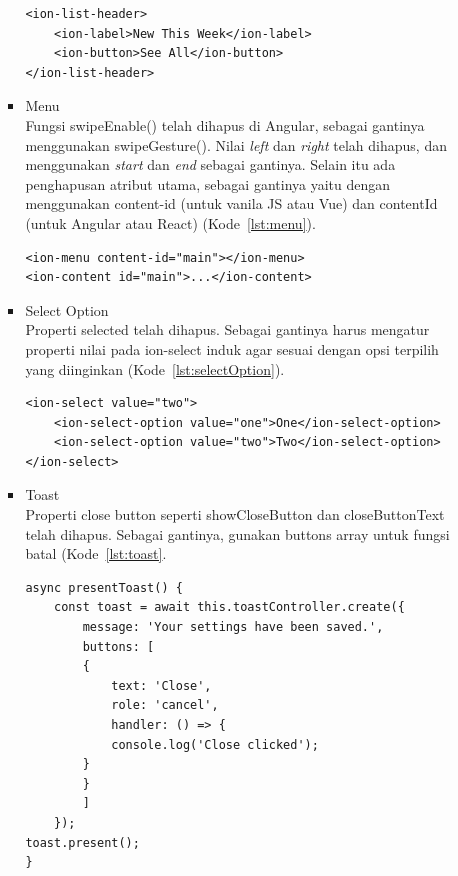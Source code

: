\begin{enumerate}
\begin{itemize}
\begin{itemize}
\begin{lstlisting}[label={lst:listHeader}, caption=Kode Program untuk List Header]
<ion-list-header>
	<ion-label>New This Week</ion-label>
	<ion-button>See All</ion-button>
</ion-list-header>
\end{lstlisting}
			\item Menu\\
			Fungsi swipeEnable() telah dihapus di Angular, sebagai gantinya menggunakan swipeGesture(). Nilai {\it left} dan {\it right} telah dihapus, dan menggunakan {\it start} dan {\it end} sebagai gantinya. Selain itu ada penghapusan atribut utama, sebagai gantinya yaitu dengan menggunakan content-id (untuk vanila JS atau Vue) dan contentId (untuk Angular atau React) (Kode~\ref{lst:menu}).			
			
\begin{lstlisting}[label={lst:menu}, caption=Kode Program untuk Menu]
<ion-menu content-id="main"></ion-menu>
<ion-content id="main">...</ion-content>
\end{lstlisting}
			\item Select Option \\
			Properti selected telah dihapus. Sebagai gantinya harus mengatur properti nilai pada ion-select induk agar sesuai dengan opsi terpilih yang diinginkan (Kode~\ref{lst:selectOption}).
\begin{lstlisting}[label={lst:selectOption}, caption=Kode Program untuk Select Option]
<ion-select value="two">
	<ion-select-option value="one">One</ion-select-option>
	<ion-select-option value="two">Two</ion-select-option>
</ion-select>
\end{lstlisting}
			
			\item Toast \\
			Properti close button seperti showCloseButton dan closeButtonText telah dihapus. Sebagai gantinya, gunakan buttons array untuk fungsi batal (Kode~\ref{lst:toast}.

			
\begin{lstlisting}[label={lst:toast}, caption=Kode Program untuk Toast]
async presentToast() {
	const toast = await this.toastController.create({
		message: 'Your settings have been saved.',
		buttons: [	
		{
			text: 'Close',
			role: 'cancel',
			handler: () => {
			console.log('Close clicked');	
		}
		}
		]
	});
toast.present();
}
\end{lstlisting}
		\end{itemize}


\end{itemize}
\end{enumerate}
